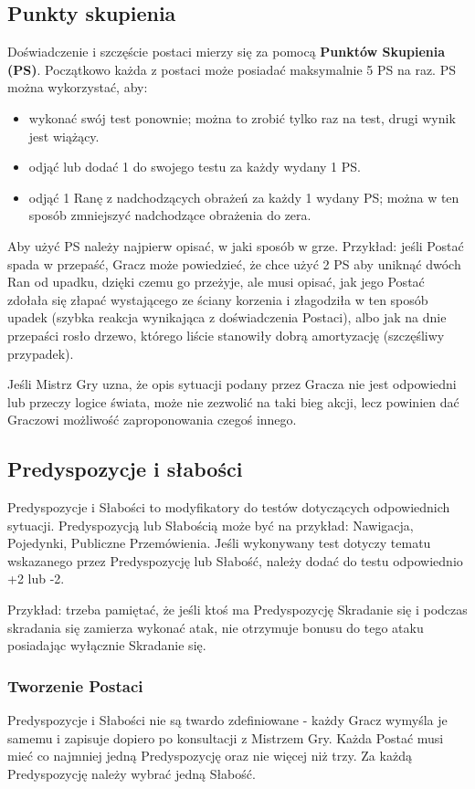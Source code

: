\documentclass[10pt,a4paper]{book}
\begin{document}
\begin{multicols}{2}
\subsection*{Punkty skupienia}
Doświadczenie i szczęście postaci mierzy się za pomocą \textbf{Punktów Skupienia (PS)}. Początkowo każda z postaci może posiadać maksymalnie 5 PS na raz. PS można wykorzystać, aby:
\begin{itemize}
	\item wykonać swój test ponownie; można to zrobić tylko raz na test, drugi wynik jest wiążący.
	\item odjąć lub dodać 1 do swojego testu za każdy wydany 1 PS.
	\item odjąć 1 Ranę z nadchodzących obrażeń za każdy 1 wydany PS; można w ten sposób zmniejszyć nadchodzące obrażenia do zera.
\end{itemize}
	
Aby użyć PS należy najpierw opisać, w jaki sposób w grze. Przykład: jeśli Postać spada w przepaść, Gracz może powiedzieć, że chce użyć 2 PS aby uniknąć dwóch Ran od upadku, dzięki czemu go przeżyje, ale musi opisać, jak jego Postać zdołała się złapać wystającego ze ściany korzenia i złagodziła w ten sposób upadek (szybka reakcja wynikająca z doświadczenia Postaci), albo jak na dnie przepaści rosło drzewo, którego liście stanowiły dobrą amortyzację (szczęśliwy przypadek).

Jeśli Mistrz Gry uzna, że opis sytuacji podany przez Gracza nie jest odpowiedni lub przeczy logice świata, może nie zezwolić na taki bieg akcji, lecz powinien dać Graczowi możliwość zaproponowania czegoś innego.


\subsection*{Predyspozycje i słabości}
Predyspozycje i Słabości to modyfikatory do testów dotyczących odpowiednich sytuacji. Predyspozycją lub Słabością może być na przykład: Nawigacja, Pojedynki, Publiczne Przemówienia. Jeśli wykonywany test dotyczy tematu wskazanego przez Predyspozycję lub Słabość, należy dodać do testu odpowiednio +2 lub -2.

Przykład: trzeba pamiętać, że jeśli ktoś ma Predyspozycję Skradanie się i podczas skradania się zamierza wykonać atak, nie otrzymuje bonusu do tego ataku posiadając wyłącznie Skradanie się.

\subsubsection*{Tworzenie Postaci}
Predyspozycje i Słabości nie są twardo zdefiniowane - każdy Gracz wymyśla je samemu i zapisuje dopiero po konsultacji z Mistrzem Gry. Każda Postać musi mieć co najmniej jedną Predyspozycję oraz nie więcej niż trzy. Za każdą Predyspozycję należy wybrać jedną Słabość.


\end{multicols}
\end{document}
